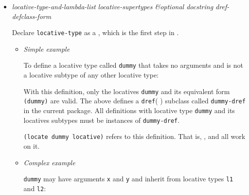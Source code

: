 \begin{itemize}
\item
  \label{x-28DREF-EXT-3ADEFINE-LOCATIVE-TYPE-20MGL-PAX-3AMACRO-29}
  \emph{locative-type-and-lambda-list locative-supertypes \&optional
  docstring dref-defclass-form}

  Declare \texttt{locative-type} as a
  ,
  which is the first step in
  .

  \begin{itemize}
  \item
    \emph{Simple example}

    To define a locative type called \texttt{dummy} that takes no
    arguments and is not a locative subtype of any other locative type:

\begin{Shaded}
\begin{Highlighting}[]
  \NormalTok{)}
\end{Highlighting}
\end{Shaded}

    With this definition, only the locatives \texttt{dummy} and its
    equivalent form \texttt{(dummy)} are valid. The above defines a
    \texttt{dref}(
    ) subclass called
    \texttt{dummy-dref} in the current package. All definitions with
    locative type \texttt{dummy} and its locatives subtypes must be
    instances of \texttt{dummy-dref}.

    \texttt{(locate\ \textquotesingle{}dummy\ \textquotesingle{}locative)}
    refers to this definition. That is,
    ,
    and
    all work on it.
  \item
    \emph{Complex example}

    \texttt{dummy} may have arguments \texttt{x} and \texttt{y} and
    inherit from locative types \texttt{l1} and \texttt{l2}:


\end{itemize}
\end{itemize}
